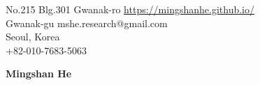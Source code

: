 \documentclass{cv} %
\begin{document}
No.215 Blg.301 Gwanak-ro \hfill  \href{https://mingshanhe.github.io/}{https://mingshanhe.github.io/}\\
Gwanak-gu \hfill mshe.research@gmail.com\\
Seoul, Korea \hfill \\ +82-010-7683-5063

\hfil{\namesize\bf Mingshan He}\hfil






% 









%


\end{document}
